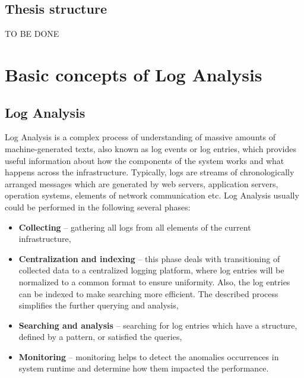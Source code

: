 \documentclass[thesis=M,english]{FITthesis}[2019/12/23]
\begin{document}
\section{Thesis structure}
TO BE DONE



\chapter{Basic concepts of Log Analysis}
\section {Log Analysis}
Log Analysis is a complex process of understanding of massive amounts of machine-generated texts, also known as log events or log entries, which provides useful information about how the components of the system works and what happens across the infrastructure. Typically, logs are streams of chronologically arranged messages which are generated by web servers, application servers, operation systems, elements of network communication etc. Log Analysis usually could be performed in the following several phases:
\begin{itemize}
	\item \textbf{Collecting} -- gathering all logs from all elements of the current infrastructure,
	\item \textbf{Centralization and indexing} -- this phase deals with transitioning of collected data to a centralized logging platform, where log entries will be normalized to a common format to ensure uniformity. Also, the log entries can be indexed to make searching more efficient. The described process simplifies the further querying and analysis,
	\item \textbf{Searching and analysis} -- searching for log entries which have a structure, defined by a pattern, or satisfied the queries,
	\item \textbf{Monitoring} -- monitoring helps to detect the anomalies occurrences in system runtime and determine how them impacted the performance. 
\end{itemize}
\end{document}
